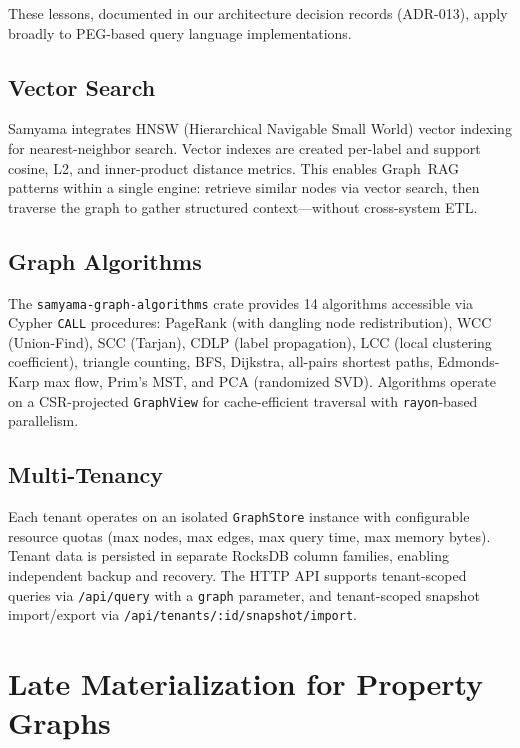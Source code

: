 \documentclass[sigconf, nonacm]{acmart}
\begin{document}
These lessons, documented in our architecture decision records (ADR-013), apply broadly to PEG-based query language implementations.

\subsection{Vector Search}

Samyama integrates HNSW (Hierarchical Navigable Small World) vector indexing for nearest-neighbor search.
Vector indexes are created per-label and support cosine, L2, and inner-product distance metrics.
This enables Graph~RAG patterns within a single engine: retrieve similar nodes via vector search, then traverse the graph to gather structured context---without cross-system ETL.

\subsection{Graph Algorithms}

The \texttt{samyama-graph-algorithms} crate provides 14 algorithms accessible via Cypher \texttt{CALL} procedures:
PageRank (with dangling node redistribution), WCC (Union-Find), SCC (Tarjan), CDLP (label propagation), LCC (local clustering coefficient), triangle counting, BFS, Dijkstra, all-pairs shortest paths, Edmonds-Karp max flow, Prim's MST, and PCA (randomized SVD).
Algorithms operate on a CSR-projected \texttt{GraphView} for cache-efficient traversal with \texttt{rayon}-based parallelism.

\subsection{Multi-Tenancy}

Each tenant operates on an isolated \texttt{GraphStore} instance with configurable resource quotas (max nodes, max edges, max query time, max memory bytes).
Tenant data is persisted in separate RocksDB column families, enabling independent backup and recovery.
The HTTP API supports tenant-scoped queries via \texttt{/api/query} with a \texttt{graph} parameter, and tenant-scoped snapshot import/export via \texttt{/api/tenants/:id/snapshot/import}.

\section{Late Materialization for Property Graphs}
\label{sec:late-mat}
\end{document}
